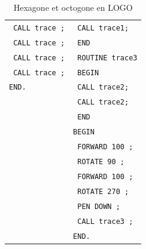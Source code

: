 \begin{table}[t]
\begin{tabular}{l|l}
  \texttt{  CALL trace ;}       &  \texttt{    CALL trace1;}     \\
  \texttt{  CALL trace ;}       &  \texttt{  END}                \\
  \texttt{  CALL trace ;}       &  \texttt{  ROUTINE trace3}     \\
  \texttt{  CALL trace ;}       &  \texttt{  BEGIN}              \\
  \texttt{END.}                 &  \texttt{   CALL trace2;}      \\ 
                                &  \texttt{    CALL trace2;}     \\ 
                                &  \texttt{  END}                \\ 
                                &  \texttt{BEGIN}                \\ 
                                &  \texttt{  FORWARD 100 ;}      \\ 
                                &  \texttt{  ROTATE 90 ;}        \\ 
                                &  \texttt{  FORWARD 100 ;}      \\ 
                                &  \texttt{  ROTATE 270 ;}       \\ 
                                &  \texttt{  PEN DOWN ;}         \\ 
                                &  \texttt{  CALL trace3 ;}      \\ 
                                &  \texttt{END.}                 \\ 
  \end{tabular}
  \caption{Hexagone et octogone en LOGO}
  \ligne
\end{table}



